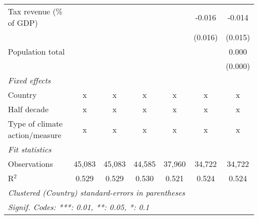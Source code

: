 \begin{tabular}{lcccccc}
   Tax revenue (\% of GDP)                     &         &              &             &              & -0.016       & -0.014\\   
                                               &         &              &             &              & (0.016)      & (0.015)\\   
   Population total                            &         &              &             &              &              & 0.000\\   
                                               &         &              &             &              &              & (0.000)\\   
   \emph{Fixed effects}\\
   Country                                     & x       & x            & x           & x            & x            & x\\  
   Half decade                                 & x       & x            & x           & x            & x            & x\\  
   Type of climate action/measure              & x       & x            & x           & x            & x            & x\\  
   \midrule \emph{Fit statistics}\\
   Observations                                & 45,083  & 45,083       & 44,585      & 37,960       & 34,722       & 34,722\\  
   R$^2$                                       & 0.529   & 0.529        & 0.530       & 0.521        & 0.524        & 0.524\\  
   \midrule
   \multicolumn{7}{l}{\emph{Clustered (Country) standard-errors in parentheses}}\\
   \multicolumn{7}{l}{\emph{Signif. Codes: ***: 0.01, **: 0.05, *: 0.1}}\\
\end{tabular}
\par\endgroup


